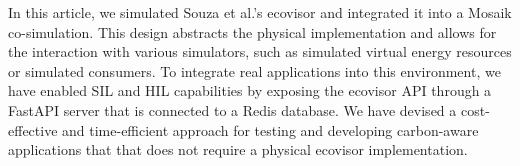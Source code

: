 In this article, we simulated Souza et al.'s \cite{souza2023} ecovisor and
integrated it into a Mosaik co-simulation. This design abstracts the physical
implementation and allows for the interaction with various simulators, such as
simulated virtual energy resources or simulated consumers. To integrate real
applications into this environment, we have enabled SIL and HIL capabilities by
exposing the ecovisor API through a FastAPI server that is connected to a Redis
database. We have devised a cost-effective and time-efficient approach for
testing and developing carbon-aware applications that that does not require a
physical ecovisor implementation.
